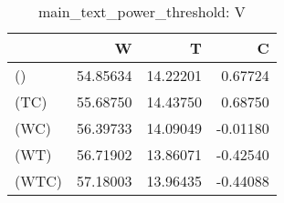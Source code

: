 \begin{table}
\centering
\caption{main_text_power_threshold: V}
\begin{tabular}{lrrr}
\toprule
{} &        W &        T &        C \\
\midrule
()    & 54.85634 & 14.22201 &  0.67724 \\
(TC)  & 55.68750 & 14.43750 &  0.68750 \\
(WC)  & 56.39733 & 14.09049 & -0.01180 \\
(WT)  & 56.71902 & 13.86071 & -0.42540 \\
(WTC) & 57.18003 & 13.96435 & -0.44088 \\
\bottomrule
\end{tabular}
\end{table}
